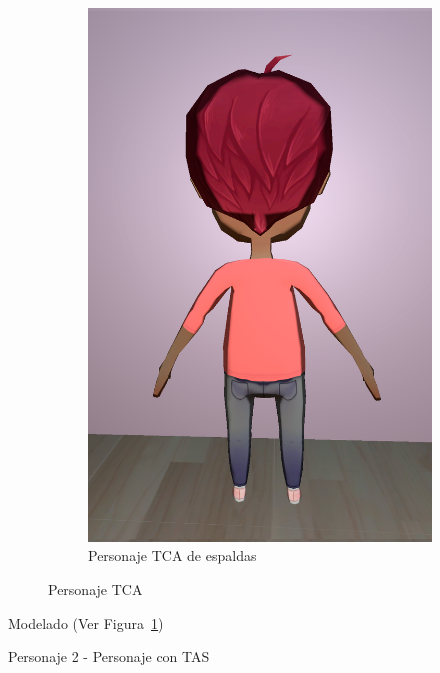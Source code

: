 \documentclass[12pt, a4paper,twoside,titlepage]{book}
\begin{document}
\begin{figure}
\begin{subfigure}{.5\textwidth}
  \includegraphics[width=.95\linewidth]{TGF/Artes/TCA_back.png}
  \caption{Personaje TCA de espaldas}
\end{subfigure}
\caption{Personaje TCA}
\label{fig:ArtesTCA2}
\end{figure}

 Modelado (Ver Figura~\ref{fig:ArtesTCA2})
 
 

Personaje 2 - Personaje con TAS
 
\end{document}
